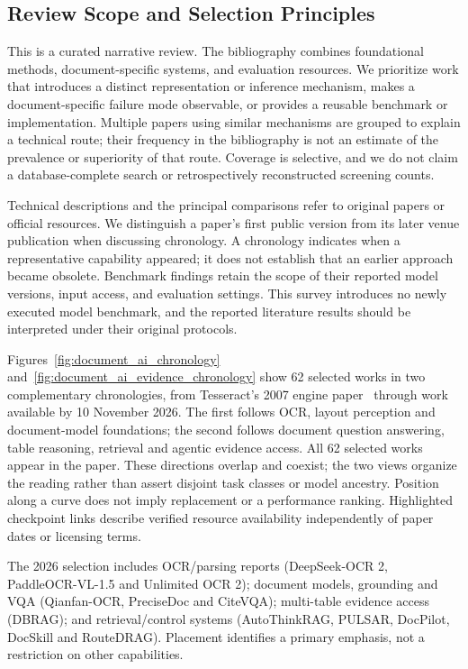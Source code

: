 \subsection{Review Scope and Selection Principles}

This is a curated narrative review. The bibliography combines foundational methods, document-specific systems, and evaluation resources. We prioritize work that introduces a distinct representation or inference mechanism, makes a document-specific failure mode observable, or provides a reusable benchmark or implementation. Multiple papers using similar mechanisms are grouped to explain a technical route; their frequency in the bibliography is not an estimate of the prevalence or superiority of that route. Coverage is selective, and we do not claim a database-complete search or retrospectively reconstructed screening counts.

Technical descriptions and the principal comparisons refer to original papers or official resources. We distinguish a paper's first public version from its later venue publication when discussing chronology. A chronology indicates when a representative capability appeared; it does not establish that an earlier approach became obsolete. Benchmark findings retain the scope of their reported model versions, input access, and evaluation settings. This survey introduces no newly executed model benchmark, and the reported literature results should be interpreted under their original protocols.

Figures~\ref{fig:document_ai_chronology} and~\ref{fig:document_ai_evidence_chronology} show 62 selected works in two complementary chronologies, from Tesseract's 2007 engine paper~\cite{smith2007overview} through work available by 10 November 2026. The first follows OCR, layout perception and document-model foundations; the second follows document question answering, table reasoning, retrieval and agentic evidence access. All 62 selected works appear in the paper. These directions overlap and coexist; the two views organize the reading rather than assert disjoint task classes or model ancestry. Position along a curve does not imply replacement or a performance ranking. Highlighted checkpoint links describe verified resource availability independently of paper dates or licensing terms.

The 2026 selection includes OCR/parsing reports (DeepSeek-OCR 2, PaddleOCR-VL-1.5 and Unlimited OCR 2)\cite{wei2026deepseekocr2visualcausal,real5omni2025,wei2026unlimitedocrworks2}; document models, grounding and VQA (Qianfan-OCR, PreciseDoc and CiteVQA)\cite{dong2026qianfanocrunifiedendtoendmodel,lu2026lmmpreciselygroundingelements,ma2026citevqabenchmarkingevidenceattribution}; multi-table evidence access (DBRAG)\cite{ampofo2026dbragmultitableretrievalaugmentedgeneration}; and retrieval/control systems (AutoThinkRAG, PULSAR, DocPilot, DocSkill and RouteDRAG)\cite{autothinkrag,constable2026pulsarpooledunifiedlateinteraction,liang2026docpilotinteractiveagentorchestration,huang2026docskillskillintegratedagenticreasoning,chen2026routedraglearningroutecontrol}. Placement identifies a primary emphasis, not a restriction on other capabilities.

